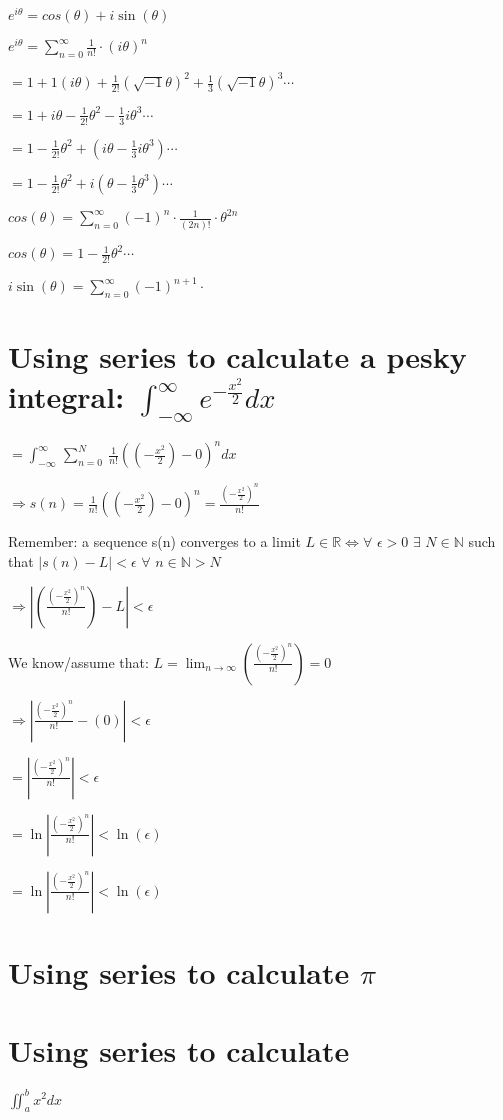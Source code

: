 \documentclass{article}
\begin{document}
\begin{enumerate}[a.]
	$e^{i\theta} = cos(\theta) + i\sin(\theta)$

	$e^{i\theta} = \sum_{n=0}^{\infty} \frac{1}{n!} \cdot (i\theta)^n$

	$ = 1 + 1(i\theta) + \frac{1}{2!}(\sqrt{-1}\theta)^2 + \frac{1}{3}(\sqrt{-1}\theta)^3 \cdots $

	$ = 1 + i\theta - \frac{1}{2!}\theta^2 - \frac{1}{3}i\theta^3  \cdots$

	$ = 1 - \frac{1}{2!}\theta^2 + (i\theta - \frac{1}{3}i\theta^3)  \cdots$

	$ = 1 - \frac{1}{2!}\theta^2 + i(\theta - \frac{1}{3}\theta^3)  \cdots$

	$cos(\theta) = \sum_{n=0}^{\infty} (-1)^n \cdot \frac{1}{(2n)!} \cdot \theta^{2n}$

	$cos(\theta) = 1 - \frac{1}{2!}\theta^2 \cdots$

	$i\sin(\theta) = \sum_{n=0}^{\infty} (-1)^{n+1} \cdot $

\end{enumerate}

\section{Using series to calculate a pesky integral: $\int _{-\infty }^{\infty \:}e^{-\frac{x^2}{2}}dx$}

    $= \int _{-\infty \:}^{\infty \:\:}\sum _{n=0}^N\:\frac{1}{n!}\left(\left(-\frac{x^2}{2}\right)-0\right)^n dx$

    $\Rightarrow s(n) = \frac{1}{n!}\left(\left(-\frac{x^2}{2}\right)-0\right)^n = \frac{\left(-\frac{x^2}{2}\right)^n}{n!}$

    Remember: a sequence s(n) converges to a limit
    $L \in\mathbb{R}\iff\forall $
    $\epsilon > 0$
    $ \exists $
    $ N \in \mathbb{N} $
    such that
    $ |s(n) - L| < \epsilon $
    $\forall$
    $ n \in \mathbb{N} > N$

    $\Rightarrow |(\frac{\left(-\frac{x^2}{2}\right)^n}{n!}) - L| < \epsilon$

    We know/assume that: $L = \lim _{n\to \infty }\left(\frac{\left(-\frac{x^2}{2}\right)^n}{n!}\right) = 0$

    $\Rightarrow |\frac{\left(-\frac{x^2}{2}\right)^n}{n!} - (0)| < \epsilon$

    $ = |\frac{\left(-\frac{x^2}{2}\right)^n}{n!}| < \epsilon$

    $ = \ln|\frac{\left(-\frac{x^2}{2}\right)^n}{n!}| < \ln(\epsilon)$

    $ = \ln|\frac{\left(-\frac{x^2}{2}\right)^n}{n!}| < \ln(\epsilon)$

\section{Using series to calculate $\pi$}

\section{Using series to calculate}

$\iint_{a}^{b} x^2 dx$
\end{document}
